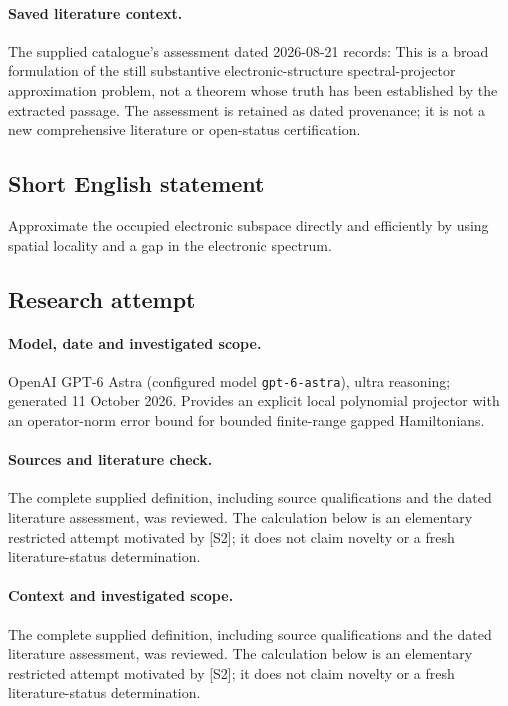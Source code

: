 \documentclass[11pt]{article}
\begin{document}
\paragraph{Saved literature context.} The supplied catalogue's assessment dated 2026-08-21 records: This is a broad formulation of the still substantive electronic-structure spectral-projector approximation problem, not a theorem whose truth has been established by the extracted passage. The assessment is retained as dated provenance; it is not a new comprehensive literature or open-status certification.
\subsection{Short English statement}
Approximate the occupied electronic subspace directly and efficiently by using spatial locality and a gap in the electronic spectrum.
\subsection{Research attempt}
\paragraph{Model, date and investigated scope.}
OpenAI GPT-6 Astra (configured model \texttt{gpt-6-astra}), ultra reasoning; generated 11 October 2026. Provides an explicit local polynomial projector with an operator-norm error bound for bounded finite-range gapped Hamiltonians.

\paragraph{Sources and literature check.}
The complete supplied definition, including source qualifications and the dated literature assessment, was reviewed. The calculation below is an elementary restricted attempt motivated by [S2]; it does not claim novelty or a fresh literature-status determination.

\paragraph{Context and investigated scope.} The complete supplied definition, including source qualifications and the dated literature assessment, was reviewed. The calculation below is an elementary restricted attempt motivated by [S2]; it does not claim novelty or a fresh literature-status determination.
\end{document}
